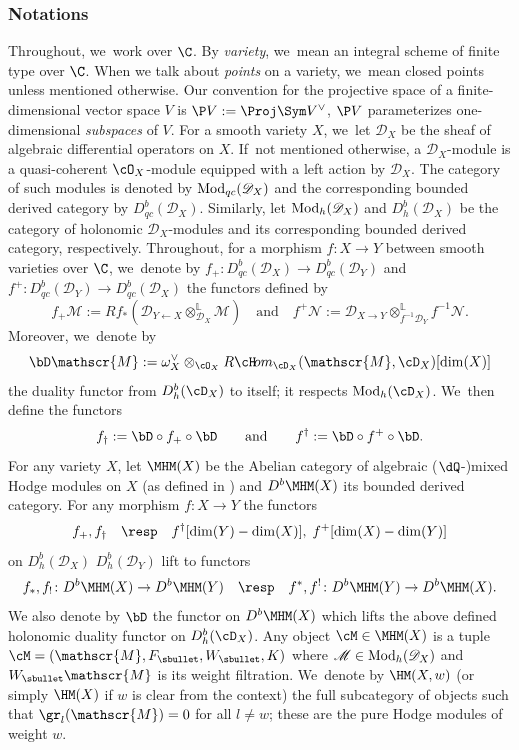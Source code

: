 \subsubsection*{Notations}
Throughout, we~work over $\C$. By \emph{variety}, we~mean an integral scheme of finite type over $\C$. When we talk about \emph{points} on a variety, we~mean closed points unless mentioned otherwise. Our convention for the projective space of a finite-dimensional vector space $V$ is $\P V := \Proj \Sym V^\vee$, \ie $\P V$ parameterizes one-dimensional \emph{subspaces} of $V$.
For a smooth variety $X$, we~let $\mathscr{D}_X$ be the sheaf of algebraic differential operators on $X$. If~not mentioned otherwise, a $\mathscr{D}_X$\nobreakdash-mod\-ule is a
quasi-coherent $\cO_X$\nobreakdash-mod\-ule equipped with a left action
by $\mathscr{D}_X$. The category of such modules is denoted by $\textup{Mod}_{qc}(\mathscr{D}_X)$ and the corresponding bounded derived category by $D_{qc}^b(\mathscr{D}_X)$.
Similarly, let $\textup{Mod}_{h}(\mathscr{D}_X)$ and $D_{h}^b(\mathscr{D}_X)$ be the category of holonomic $\mathscr D_X$\nobreakdash-mod\-ules and its corresponding bounded derived category, respectively.
Throughout, for a morphism $f \colon X \to Y$ between smooth varieties over $\C$, we~denote by $f_+ \colon D_{qc}^b(\mathscr D_X) \to D_{qc}^b(\mathscr D_Y)$ and $f^+ \colon D_{qc}^b(\mathscr D_Y) \to D_{qc}^b(\mathscr D_X)$ the functors defined by
\[
f_+ \mathscr M := Rf_*(\mathscr D_{Y \leftarrow X} \otimes^{\mathbb L}_{\mathscr D_X} \mathscr M)
\quad \text{and} \quad
f^+\mathscr N := \mathscr D_{X \to Y} \otimes^{\mathbb L}_{f^{-1} \mathscr D_Y} f^{-1} \mathscr N.
\]
Moreover, we~denote by
\[
\bD \mathscr{M} := \omega^\vee_X\otimes_{\cO_X} R{\cH\!}om_{\cD_X}(\mathscr{M},\cD_X)[\dim(X)]
\]
the duality functor from $D^b_h(\cD_X)$ to itself; it respects
$\textup{Mod}_h(\cD_X)$. We~then define the functors
\[
f_\dag:=\bD\circ f_+ \circ \bD
\quad\quad
\textup{and}
\quad\quad
f^\dag:=\bD\circ f^+ \circ \bD.
\]
For any variety $X$, let $\MHM(X)$ be the Abelian category of algebraic
($\dQ$\nobreakdash-)mixed Hodge modules on $X$ (as defined in \cite{Saito1, SaitoMHM}) and $D^b \MHM(X)$ its bounded derived category. For any morphism $f\colon X\to Y$ the functors
\[
f_+, f_\dag\quad \text{\resp}\quad f^\dag[\dim(Y)-\nobreak\dim(X)],\; f^+[\dim(X)-\dim(Y)]
\]
on $D^b_{h}(\mathscr{D}_X)$ \resp $D^b_{h}(\mathscr{D}_Y)$ lift to functors
\[
f_*, f_!\colon D^b\MHM(X)\to D^b\MHM(Y)
\quad
\textup{\resp}
\quad
f^*, f^!\colon D^b\MHM(Y)\to D^b\MHM(X).
\]
\Changel
We also denote by $\bD$ the functor on $D^b \MHM(X)$ which lifts the above defined holonomic duality functor on $D^b_h(\cD_X)$.
Any object $\cM\in \MHM(X)$ is a tuple
$\cM=(\mathscr{M},F_\sbullet, W_\sbullet, K)$ where
$\mathscr{M}\in\textup{Mod}_h(\mathscr{D}_X)$ and $W_\sbullet\mathscr{M}$ is its weight filtration. We~denote by
$\HM(X,w)$ (or simply $\HM(X)$ if $w$ is clear from the context) the full subcategory of objects such that
$\gr_l(\mathscr{M})=0$ for all $l\neq w$; these are the pure Hodge modules of weight $w$.

